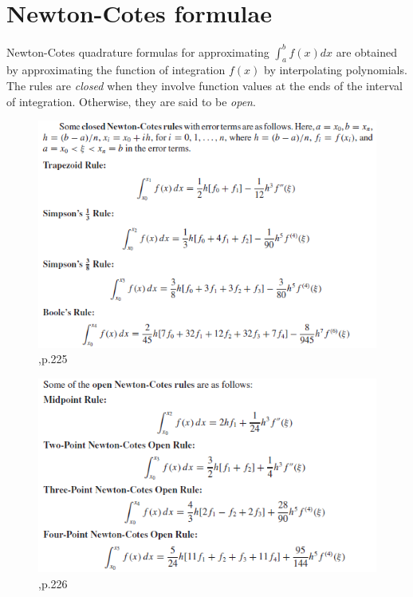 \documentclass[12pt]{article}
\theoremstyle{theorem}
\begin{document}
\section{Newton-Cotes formulae}

Newton-Cotes quadrature formulas for approximating $\int_{a}^{b} f(x) dx$ are obtained by approximating the function of integration $f(x)$ by interpolating polynomials. 
The rules are \emph{closed} when they involve function values at the ends of the interval of integration. Otherwise, they are said to be \emph{open}.

\begin{figure}[h!]
	\centering
	\includegraphics[scale=0.9]{Figures/44}
	\caption{\cite{BurF10},p.225}
	\label{fig:44}
\end{figure}

\begin{figure}[h!]
	\centering
	\includegraphics[scale=0.9]{Figures/45}
	\caption{\cite{BurF10},p.226}
	\label{fig:45}
\end{figure}
\end{document}
